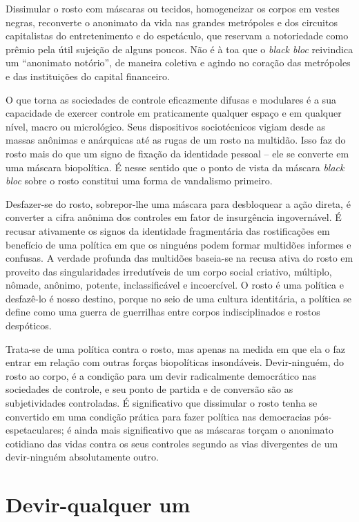 Dissimular o rosto com máscaras ou tecidos, homogeneizar os corpos em
vestes negras, reconverte o anonimato da vida nas grandes metrópoles e
dos circuitos capitalistas do entretenimento e do espetáculo, que
reservam a notoriedade como prêmio pela útil sujeição de alguns poucos.
Não é à toa que o \emph{black bloc }reivindica um ``anonimato
notório'', de maneira coletiva e agindo no coração das metrópoles
e das instituições do capital financeiro.

O que torna as sociedades de controle eficazmente difusas e modulares é
a sua capacidade de exercer controle em praticamente qualquer espaço e
em qualquer nível, macro ou micrológico. Seus dispositivos sociotécnicos
vigiam desde as massas anônimas e anárquicas até as rugas de um rosto na
multidão. Isso faz do rosto mais do que um signo de fixação da
identidade pessoal -- ele se converte em uma máscara biopolítica. É
nesse sentido que o ponto de vista da máscara \emph{black bloc} sobre o
rosto constitui uma forma de vandalismo primeiro.

Desfazer-se do rosto, sobrepor-lhe uma máscara para desbloquear a ação
direta, é converter a cifra anônima dos controles em fator de
insurgência ingovernável. É recusar ativamente os signos da identidade
fragmentária das rostificações em benefício de uma política em que os
ninguéns podem formar multidões informes e confusas. A verdade profunda
das multidões baseia-se na recusa ativa do rosto em proveito das
singularidades irredutíveis de um corpo social criativo, múltiplo,
nômade, anônimo, potente, inclassificável e incoercível. O rosto é uma
política e desfazê-lo é nosso destino, porque no seio de uma cultura
identitária, a política se define como uma guerra de guerrilhas entre
corpos indisciplinados e rostos despóticos.

Trata-se de uma política contra o rosto, mas apenas na medida em que ela
o faz entrar em relação com outras forças biopolíticas insondáveis.
Devir-ninguém, do rosto ao corpo, é a condição para um devir
radicalmente democrático nas sociedades de controle, e seu ponto de
partida e de conversão são as subjetividades controladas. É
significativo que dissimular o rosto tenha se convertido em uma condição
prática para fazer política nas democracias pós-espetaculares; é ainda
mais significativo que as máscaras torçam o anonimato cotidiano das
vidas contra os seus controles segundo as vias divergentes de um
devir-ninguém absolutamente outro.

\section{Devir-qualquer um}

